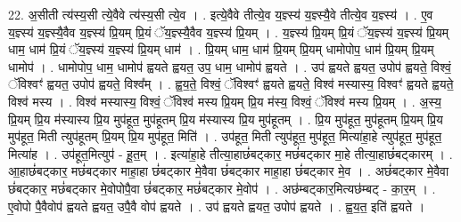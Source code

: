 \documentclass[17pt]{extarticle}
\begin{document}
22. अ॒सीती त्य॑स्य॒सी त्ये॒वैवे त्य॑स्य॒सी त्ये॒व । . इत्ये॒वैवे तीत्ये॒व य॒ज्ञ्स्य॑ य॒ज्ञ्स्यै॒वे तीत्ये॒व य॒ज्ञ्स्य॑ । . ए॒व य॒ज्ञ्स्य॑ य॒ज्ञ्स्यै॒वैव य॒ज्ञ्स्य॑ प्रि॒यम् प्रि॒यं ॅय॒ज्ञ्स्यै॒वैव य॒ज्ञ्स्य॑ प्रि॒यम् । . य॒ज्ञ्स्य॑ प्रि॒यम् प्रि॒यं ॅय॒ज्ञ्स्य॑ य॒ज्ञ्स्य॑ प्रि॒यम् धाम॒ धाम॑ प्रि॒यं ॅय॒ज्ञ्स्य॑ य॒ज्ञ्स्य॑ प्रि॒यम् धाम॑ । . प्रि॒यम् धाम॒ धाम॑ प्रि॒यम् प्रि॒यम् धामोपोप॒ धाम॑ प्रि॒यम् प्रि॒यम् धामोप॑ । . धामोपोप॒ धाम॒ धामोप॑ ह्वयते ह्वयत॒ उप॒ धाम॒ धामोप॑ ह्वयते । . उप॑ ह्वयते ह्वयत॒ उपोप॑ ह्वयते॒ विश्वं॒ ॅविश्वꣳ॑ ह्वयत॒ उपोप॑ ह्वयते॒ विश्व᳚म् । . ह्व॒य॒ते॒ विश्वं॒ ॅविश्वꣳ॑ ह्वयते ह्वयते॒ विश्व॑ मस्यास्य॒ विश्वꣳ॑ ह्वयते ह्वयते॒ विश्व॑ मस्य । . विश्व॑ मस्यास्य॒ विश्वं॒ ॅविश्व॑ मस्य प्रि॒यम् प्रि॒य म॑स्य॒ विश्वं॒ ॅविश्व॑ मस्य प्रि॒यम् । . अ॒स्य॒ प्रि॒यम् प्रि॒य म॑स्यास्य प्रि॒य मुप॑हूत॒ मुप॑हूतम् प्रि॒य म॑स्यास्य प्रि॒य मुप॑हूतम् । . प्रि॒य मुप॑हूत॒ मुप॑हूतम् प्रि॒यम् प्रि॒य मुप॑हूत॒ मिती त्युप॑हूतम् प्रि॒यम् प्रि॒य मुप॑हूत॒ मिति॑ । . उप॑हूत॒ मिती त्युप॑हूत॒ मुप॑हूत॒ मित्या॑हा॒हे त्युप॑हूत॒ मुप॑हूत॒ मित्या॑ह । . उप॑हूत॒मित्युप॑ - हू॒त॒म् । . इत्या॑हा॒हे तीत्या॒हाछं॑बट्कार॒ मछं॑बट्कार मा॒हे तीत्या॒हाछं॑बट्कारम् । . आ॒हाछं॑बट्कार॒ मछं॑बट्कार माहा॒हा छं॑बट्कार मे॒वैवा छं॑बट्कार माहा॒हा छं॑बट्कार मे॒व । . अछं॑बट्कार मे॒वैवा छं॑बट्कार॒ मछं॑बट्कार मे॒वोपोपै॒वा छं॑बट्कार॒ मछं॑बट्कार मे॒वोप॑ । . अछ॑म्बट्कार॒मित्यछ॑म्बट् - का॒र॒म् । . ए॒वोपो पै॒वैवोप॑ ह्वयते ह्वयत॒ उपै॒वै वोप॑ ह्वयते । . उप॑ ह्वयते ह्वयत॒ उपोप॑ ह्वयते । . ह्व॒य॒त॒ इति॑ ह्वयते । \newline
\pagebreak
{}
\end{document}
